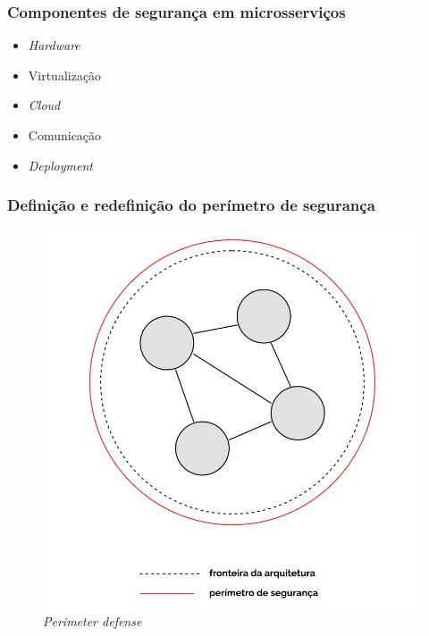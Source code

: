 \begin{frame}
    \frametitle{Componentes de segurança em microsserviços}
    \begin{itemize}
        \item \textit{Hardware}  
        \item Virtualização
        \item \textit{Cloud}
        \item Comunicação
        \item \textit{Deployment}
    \end{itemize}    
\end{frame}    

\begin{frame}
    \frametitle{Definição e redefinição do perímetro de segurança}
    \begin{figure}
        \begin{minipage}[c]{0.4\textwidth}
            \centering
            \includegraphics[width=1.2\textwidth]{./assets/seguranca/perimeter_defense.png}
            \caption{\textit{Perimeter defense}} 
        \end{minipage}\hfill
        \begin{minipage}[c]{0.4\textwidth}
            \centering

\end{minipage}
\end{figure}
\end{frame}
